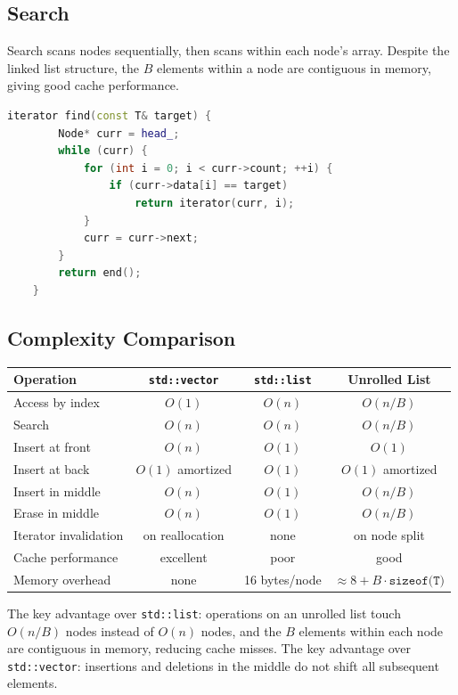 \subsection{Search}

Search scans nodes sequentially, then scans within each node's array. Despite the linked list structure, the $B$ elements within a node are contiguous in memory, giving good cache performance.

\begin{lstlisting}[language=C++]
    iterator find(const T& target) {
        Node* curr = head_;
        while (curr) {
            for (int i = 0; i < curr->count; ++i) {
                if (curr->data[i] == target)
                    return iterator(curr, i);
            }
            curr = curr->next;
        }
        return end();
    }
\end{lstlisting}

\subsection{Complexity Comparison}

\begin{center}
\begin{tabular}{lccc}
\toprule
\textbf{Operation} & \texttt{std::vector} & \texttt{std::list} & \textbf{Unrolled List} \\
\midrule
Access by index & $O(1)$ & $O(n)$ & $O(n/B)$ \\
Search & $O(n)$ & $O(n)$ & $O(n/B)$ \\
Insert at front & $O(n)$ & $O(1)$ & $O(1)$ \\
Insert at back & $O(1)$ amortized & $O(1)$ & $O(1)$ amortized \\
Insert in middle & $O(n)$ & $O(1)$ & $O(n/B)$ \\
Erase in middle & $O(n)$ & $O(1)$ & $O(n/B)$ \\
Iterator invalidation & on reallocation & none & on node split \\
Cache performance & excellent & poor & good \\
Memory overhead & none & 16 bytes/node & $\approx 8 + B \cdot \texttt{sizeof(T)}$ \\
\bottomrule
\end{tabular}
\end{center}

The key advantage over \texttt{std::list}: operations on an unrolled list touch $O(n/B)$ nodes instead of $O(n)$ nodes, and the $B$ elements within each node are contiguous in memory, reducing cache misses. The key advantage over \texttt{std::vector}: insertions and deletions in the middle do not shift all subsequent elements.

